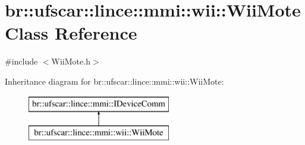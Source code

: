 \hypertarget{classbr_1_1ufscar_1_1lince_1_1mmi_1_1wii_1_1WiiMote}{
\section{br::ufscar::lince::mmi::wii::WiiMote Class Reference}
\label{classbr_1_1ufscar_1_1lince_1_1mmi_1_1wii_1_1WiiMote}
}


{\ttfamily \#include $<$WiiMote.h$>$}

Inheritance diagram for br::ufscar::lince::mmi::wii::WiiMote:\begin{figure}[H]
\begin{center}
\leavevmode
\includegraphics[height=2cm]{classbr_1_1ufscar_1_1lince_1_1mmi_1_1wii_1_1WiiMote}
\end{center}
\end{figure}

